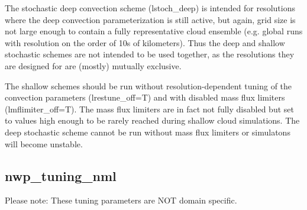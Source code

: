 The stochastic deep convection scheme (lstoch\_deep) is intended for resolutions where the deep convection parameterization is still active, but again, grid size is not large enough to contain a fully representative cloud ensemble (e.g. global runs with resolution on the order of 10s of kilometers). Thus the deep and shallow stochastic schemes are not intended to be used together, as the resolutions they are designed for are (mostly) mutually exclusive.

The shallow schemes should be run without resolution-dependent tuning of the convection parameters (lrestune\_off=T) and with disabled mass flux limiters (lmflimiter\_off=T). The mass flux limiters are in fact not fully disabled but set to values high enough to be rarely reached during shallow cloud simulations.
The deep stochastic scheme cannot be run without mass flux limiters or simulatons will become unstable.

\subsection{nwp\_tuning\_nml}

Please note: These tuning parameters are NOT domain specific.

